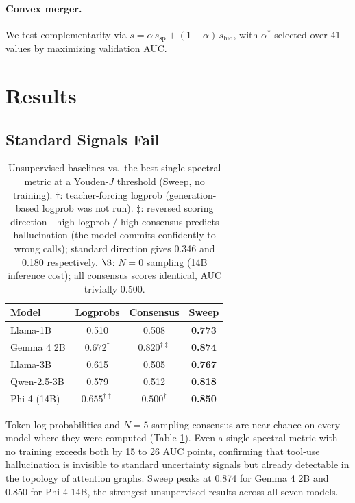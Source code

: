 \documentclass{article}
\begin{document}
\paragraph{Convex merger.}
We test complementarity via $s = \alpha\, s_\text{sp} + (1{-}\alpha)\,
s_\text{hid}$, with $\alpha^*$ selected over 41 values by maximizing
validation AUC.


\section{Results}
\label{sec:results}

\subsection{Standard Signals Fail}

\begin{table}[t]
\centering
\caption{Unsupervised baselines vs.\ the best single spectral metric at
  a Youden-$J$ threshold (Sweep, no training).
  $\dagger$: teacher-forcing logprob (generation-based logprob was not run).
  $\ddagger$: reversed scoring direction---high logprob / high consensus
  predicts hallucination (the model commits confidently to wrong calls);
  standard direction gives 0.346 and 0.180 respectively.
  $\S$: $N{=}0$ sampling (14B inference cost); all consensus scores
  identical, AUC trivially 0.500.}
\label{tab:baselines}
\small
\begin{tabular}{lccc}
\toprule
Model & Logprobs & Consensus & Sweep \\
\midrule
Llama-1B          & 0.510 & 0.508 & \textbf{0.773} \\
Gemma 4 2B        & $0.672^{\dagger}$ & $0.820^{\dagger\ddagger}$ & \textbf{0.874} \\
Llama-3B          & 0.615 & 0.505 & \textbf{0.767} \\
Qwen-2.5-3B       & 0.579 & 0.512 & \textbf{0.818} \\
Phi-4 (14B)       & $0.655^{\dagger\ddagger}$ & $0.500^{\dagger}$ & \textbf{0.850} \\
\bottomrule
\end{tabular}
\end{table}

Token log-probabilities and $N{=}5$ sampling consensus are near chance
on every model where they were computed (Table \ref{tab:baselines}).
Even a single spectral metric with no training exceeds both by 15 to
26 AUC points, confirming that tool-use hallucination is invisible to
standard uncertainty signals but already detectable in the topology of
attention graphs.  Sweep peaks at 0.874 for Gemma 4 2B and 0.850 for
Phi-4 14B, the strongest unsupervised results across all seven models.
\end{document}
